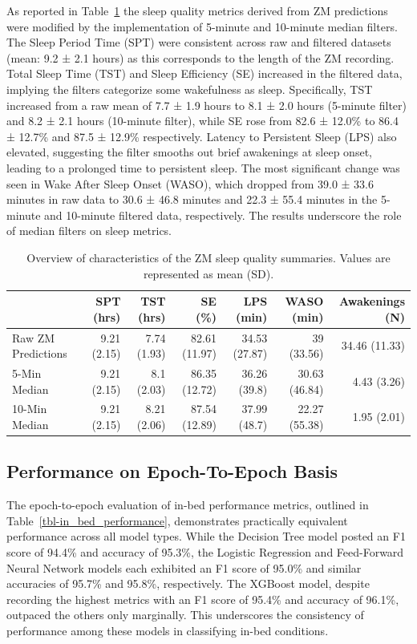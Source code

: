 \documentclass[
  super,
  preprint,
  3p]{elsarticle}
\begin{document}
As reported in Table~\ref{tbl-zm_overview} the sleep quality metrics
derived from ZM predictions were modified by the implementation of
5-minute and 10-minute median filters. The Sleep Period Time (SPT) were
consistent across raw and filtered datasets (mean: 9.2 ± 2.1 hours) as
this corresponds to the length of the ZM recording. Total Sleep Time
(TST) and Sleep Efficiency (SE) increased in the filtered data, implying
the filters categorize some wakefulness as sleep. Specifically, TST
increased from a raw mean of 7.7 ± 1.9 hours to 8.1 ± 2.0 hours
(5-minute filter) and 8.2 ± 2.1 hours (10-minute filter), while SE rose
from 82.6 ± 12.0\% to 86.4 ± 12.7\% and 87.5 ± 12.9\% respectively.
Latency to Persistent Sleep (LPS) also elevated, suggesting the filter
smooths out brief awakenings at sleep onset, leading to a prolonged time
to persistent sleep. The most significant change was seen in Wake After
Sleep Onset (WASO), which dropped from 39.0 ± 33.6 minutes in raw data
to 30.6 ± 46.8 minutes and 22.3 ± 55.4 minutes in the 5-minute and
10-minute filtered data, respectively. The results underscore the role
of median filters on sleep metrics.

\hypertarget{tbl-zm_overview}{}
\begin{longtable}{lrrrrrr}
\caption{\label{tbl-zm_overview}Overview of characteristics of the ZM sleep quality summaries. Values
are represented as mean (SD). }\tabularnewline

\toprule
 & SPT (hrs) & TST (hrs) & SE (\%) & LPS (min) & WASO (min) & Awakenings (N) \\ 
\midrule
Raw ZM Predictions & 9.21 (2.15) & 7.74 (1.93) & 82.61 (11.97) & 34.53 (27.87) & 39 (33.56) & 34.46 (11.33) \\ 
5-Min Median & 9.21 (2.15) & 8.1 (2.03) & 86.35 (12.72) & 36.26 (39.8) & 30.63 (46.84) & 4.43 (3.26) \\ 
10-Min Median & 9.21 (2.15) & 8.21 (2.06) & 87.54 (12.89) & 37.99 (48.7) & 22.27 (55.38) & 1.95 (2.01) \\ 
\bottomrule
\end{longtable}

\hypertarget{performance-on-epoch-to-epoch-basis}{%
\subsection{Performance on Epoch-To-Epoch
Basis}\label{performance-on-epoch-to-epoch-basis}}

The epoch-to-epoch evaluation of in-bed performance metrics, outlined in
Table~\ref{tbl-in_bed_performance}, demonstrates practically equivalent
performance across all model types. While the Decision Tree model posted
an F1 score of 94.4\% and accuracy of 95.3\%, the Logistic Regression
and Feed-Forward Neural Network models each exhibited an F1 score of
95.0\% and similar accuracies of 95.7\% and 95.8\%, respectively. The
XGBoost model, despite recording the highest metrics with an F1 score of
95.4\% and accuracy of 96.1\%, outpaced the others only marginally. This
underscores the consistency of performance among these models in
classifying in-bed conditions.
\end{document}
